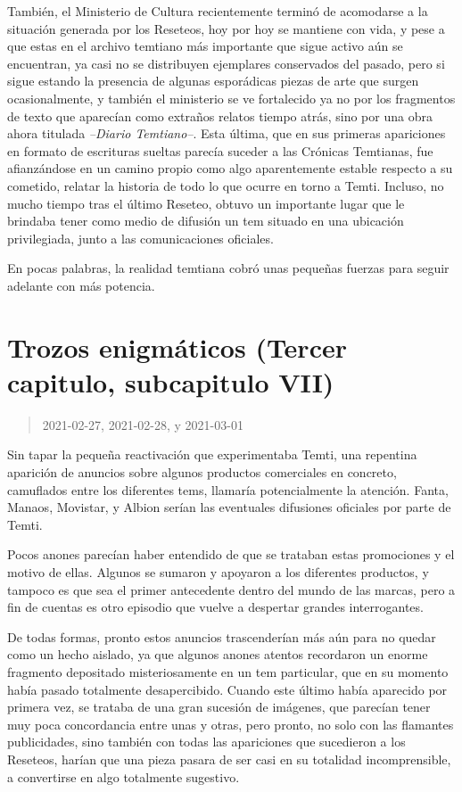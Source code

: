 \documentclass[
  spanish,
]{book}
\begin{document}
También, el Ministerio de Cultura recientemente terminó de acomodarse a la situación generada por los Reseteos, hoy por hoy se mantiene con vida, y pese a que estas en el archivo temtiano más importante que sigue activo aún se encuentran, ya casi no se distribuyen ejemplares conservados del pasado, pero si sigue estando la presencia de algunas esporádicas piezas de arte que surgen ocasionalmente, y también el ministerio se ve fortalecido ya no por los fragmentos de texto que aparecían como extraños relatos tiempo atrás, sino por una obra ahora titulada \emph{--Diario Temtiano--}. Esta última, que en sus primeras apariciones en formato de escrituras sueltas parecía suceder a las Crónicas Temtianas, fue afianzándose en un camino propio como algo aparentemente estable respecto a su cometido, relatar la historia de todo lo que ocurre en torno a Temti. Incluso, no mucho tiempo tras el último Reseteo, obtuvo un importante lugar que le brindaba tener como medio de difusión un tem situado en una ubicación privilegiada, junto a las comunicaciones oficiales.

En pocas palabras, la realidad temtiana cobró unas pequeñas fuerzas para seguir adelante con más potencia.

\hypertarget{trozos-enigmuxe1ticos-tercer-capitulo-subcapitulo-vii}{%
\section{Trozos enigmáticos (Tercer capitulo, subcapitulo VII)}\label{trozos-enigmuxe1ticos-tercer-capitulo-subcapitulo-vii}}

\begin{quote}
2021-02-27, 2021-02-28, y 2021-03-01
\end{quote}

Sin tapar la pequeña reactivación que experimentaba Temti, una repentina aparición de anuncios sobre algunos productos comerciales en concreto, camuflados entre los diferentes tems, llamaría potencialmente la atención. Fanta, Manaos, Movistar, y Albion serían las eventuales difusiones oficiales por parte de Temti.

Pocos anones parecían haber entendido de que se trataban estas promociones y el motivo de ellas. Algunos se sumaron y apoyaron a los diferentes productos, y tampoco es que sea el primer antecedente dentro del mundo de las marcas, pero a fin de cuentas es otro episodio que vuelve a despertar grandes interrogantes.

De todas formas, pronto estos anuncios trascenderían más aún para no quedar como un hecho aislado, ya que algunos anones atentos recordaron un enorme fragmento depositado misteriosamente en un tem particular, que en su momento había pasado totalmente desapercibido.
Cuando este último había aparecido por primera vez, se trataba de una gran sucesión de imágenes, que parecían tener muy poca concordancia entre unas y otras, pero pronto, no solo con las flamantes publicidades, sino también con todas las apariciones que sucedieron a los Reseteos, harían que una pieza pasara de ser casi en su totalidad incomprensible, a convertirse en algo totalmente sugestivo.
\end{document}
